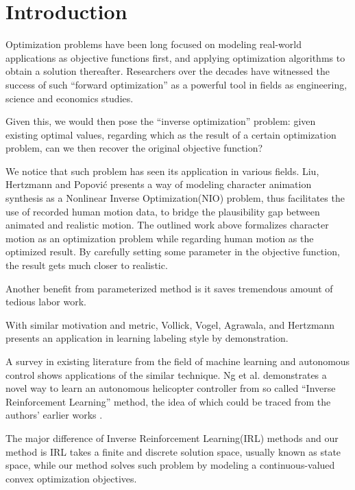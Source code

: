 \section{Introduction}\label{sec:introduction}

Optimization problems have been long focused on modeling real-world applications as objective functions first, and applying optimization algorithms to obtain a solution thereafter.
Researchers over the decades have witnessed the success of such ``forward optimization'' as a powerful tool in fields as engineering, science and economics studies.

Given this, we would then pose the ``inverse optimization'' problem: given existing optimal values, regarding which as the result of a certain optimization problem, can we then recover the original objective function?

We notice that such problem has seen its application in various fields.
Liu, Hertzmann and Popovi\'{c} \cite{Liu:2005:LPM} presents a way of modeling character animation synthesis as a Nonlinear Inverse Optimization(NIO) problem, thus facilitates the use of recorded human motion data, to bridge the plausibility gap between animated and realistic motion.
The outlined work above formalizes character motion as an optimization problem while regarding human motion as the optimized result. By carefully setting some parameter in the objective function, the result gets much closer to realistic.

Another benefit from parameterized method is it saves tremendous amount of tedious labor work.

With similar motivation and metric, Vollick, Vogel, Agrawala, and Hertzmann \cite{Vollick:2007:SLL} presents an application in learning labeling style by demonstration.

A survey in existing literature from the field of machine learning and autonomous control shows applications of the similar technique.
Ng et al. \cite{Coates:2009:ALH} demonstrates a novel way to learn an autonomous helicopter controller from so called ``Inverse Reinforcement Learning'' method, the idea of which could be traced from the authors' earlier works \cite{Ng:2000:AIR}.

The major difference of Inverse Reinforcement Learning(IRL) methods and our method is IRL takes a finite and discrete solution space, usually known as state space, while our method solves such problem by modeling a continuous-valued convex optimization objectives.

